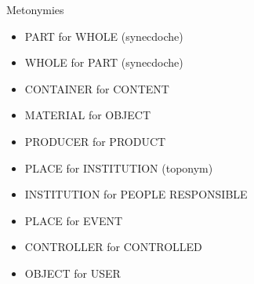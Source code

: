 \begin{frame}[allowframebreaks]{Metonymies}  %

\begin{itemize}
\item PART for WHOLE (synecdoche)
  \begin{exe}
    \ex {}
  \end{exe}
\item WHOLE for PART (synecdoche)
  \begin{exe}
    \ex {}
  \end{exe}
\item CONTAINER for CONTENT
  \begin{exe}
    \ex {}
  \end{exe}
\item MATERIAL for OBJECT
  \begin{exe}
    \ex {}
   \end{exe}
\item PRODUCER for PRODUCT
  \begin{exe}
    \ex {}
  \end{exe}
  \framebreak
\item PLACE for INSTITUTION (toponym)
  \begin{exe}
    \ex {}
  \end{exe}
 \item INSTITUTION for PEOPLE RESPONSIBLE
   \begin{exe}
     \ex {}
   \end{exe}
\item PLACE for EVENT
  \begin{exe}
    \ex {}
  \end{exe}
 \item CONTROLLER for CONTROLLED
   \begin{exe}
     \ex {}
   \end{exe}
 \item OBJECT for USER
   \begin{exe}
     \ex {}
   \end{exe}
\end{itemize}

\end{frame}

